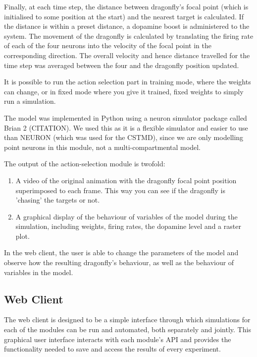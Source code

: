\documentclass[a4paper,11pt]{article}
\begin{document}
Finally, at each time step, the distance between dragonfly's focal point (which is initialised to some position at the start) and the nearest target is calculated. If the distance is within a preset distance, a dopamine boost is administered to the system. The movement of the dragonfly is calculated by translating the firing rate of each of the four neurons into the velocity of the focal point in the corresponding direction. The overall velocity and hence distance travelled for the time step was averaged between the four and the dragonfly position updated. 

It is possible to run the action selection part in training mode, where the weights can change, or in fixed mode where you give it trained, fixed weights to simply run a simulation. 

The model was implemented in Python using a neuron simulator package called Brian 2 (CITATION). We used this as it is a flexible simulator and easier to use than NEURON (which was used for the CSTMD), since we are only modelling point neurons in this module, not a multi-compartmental model. 

The output of the action-selection module is twofold:
\begin{enumerate}
\item A video of the original animation with the dragonfly focal point position superimposed to each frame. This way you can see if the dragonfly is 'chasing' the targets or not.
\item A graphical display of the behaviour of variables of the model during the simulation, including weights, firing rates, the dopamine level and a raster plot.
\end{enumerate}
In the web client, the user is able to change the parameters of the model and observe how the resulting dragonfly's behaviour, as well as the behaviour of variables in the model.

\subsection{Web Client}
The web client is designed to be a simple interface through which simulations for each of the modules can be run and automated, both separately and jointly. This graphical user interface interacts with each module's API and provides the functionality needed to save and access the results of every experiment.
\end{document}
